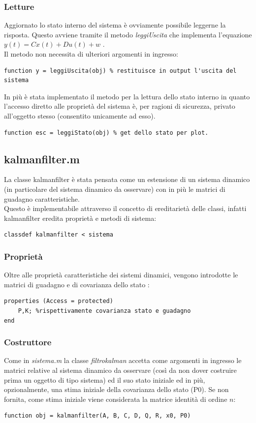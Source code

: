 \subsubsection{Letture}
Aggiornato lo stato interno del sistema è ovviamente possibile leggerne la risposta. Questo avviene tramite il metodo \textit{leggiUscita} che implementa l'equazione $y(t) = Cx(t)+Du(t)+w$ .\\
Il metodo non necessita di ulteriori argomenti in ingresso:

\begin{lstlisting}[frame=single]
function y = leggiUscita(obj) % restituisce in output l'uscita del sistema 
\end{lstlisting}

In più è stata implementato il metodo per la lettura dello stato interno in quanto l'accesso diretto alle proprietà del sistema è, per ragioni di sicurezza, privato all'oggetto stesso (consentito unicamente ad esso).
\begin{lstlisting}[frame=single]
function esc = leggiStato(obj) % get dello stato per plot.
\end{lstlisting}

\newpage

\subsection{kalmanfilter.m}
La classe kalmanfilter è stata pensata come un estensione di un sistema dinamico (in particolare del sistema dinamico da osservare) con in più le matrici di guadagno caratteristiche.\\
Questo è implementabile attraverso il concetto di ereditarietà delle classi, infatti kalmanfilter eredita proprietà e metodi di sistema:
\begin{lstlisting}[frame=single]
classdef kalmanfilter < sistema 
\end{lstlisting}
\subsubsection{Proprietà}
Oltre alle proprietà caratteristiche dei sistemi dinamici, vengono introdotte le matrici di guadagno e di covarianza dello stato :
\begin{lstlisting}[frame=single]
properties (Access = protected)
	P,K; %rispettivamente covarianza stato e guadagno
end
\end{lstlisting}
\subsubsection{Costruttore}
Come in \textit{sistema.m} la classe \textit{filtrokalman} accetta come argomenti in ingresso le matrici relative al sistema dinamico da osservare (così da non dover costruire prima un oggetto di tipo sistema) ed il suo stato iniziale ed in più, opzionalmente, una stima  iniziale della covarianza dello stato (P0). Se non fornita, come stima iniziale viene considerata la matrice identità di ordine $n$:
\begin{lstlisting}[frame=single]
function obj = kalmanfilter(A, B, C, D, Q, R, x0, P0)
\end{lstlisting}

